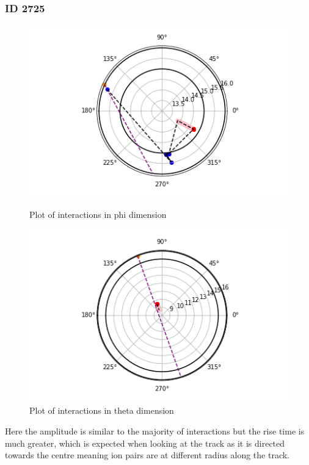 \documentclass[a4paper]{article}
\begin{document}
\subsubsection{ID 2725}
\begin{figure}[H]
    \centering
    \begin{minipage}{.5\textwidth}
        \centering
        \includegraphics[width=1\linewidth]{id 2725/achinos_2725_phi.png}
        \caption{Plot of interactions in phi dimension}
        \label{fig:prob1_6_2}
    \end{minipage}%
    \begin{minipage}{0.5\textwidth}
        \centering
        \includegraphics[width=1\linewidth]{id 46749/achinos_46749_theta.png}
        \caption{Plot of interactions in theta dimension}
        \label{fig:prob1_6_1}
    \end{minipage}
\end{figure}
\noindent Here the amplitude is similar to the majority of interactions but the rise time is much greater, which is expected when looking at the track as it is directed towards the centre meaning ion pairs are at different radius along the track. 
\end{document}

